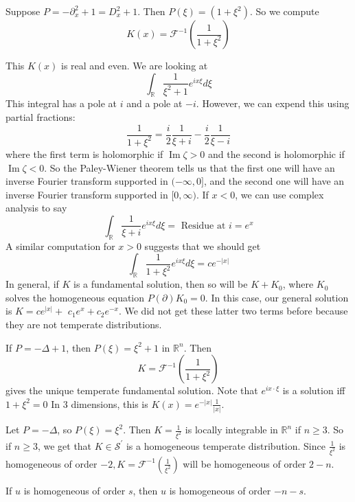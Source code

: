 \begin{example}
    Suppose $P=-\partial_{x}^{2}+1=D_{x}^{2}+1$. Then $P(\xi)=\left(1+\xi^{2}\right)$. So we compute
    $$
    K(x)=\mathcal{F}^{-1}\left(\frac{1}{1+\xi^{2}}\right)
    $$

    This $K(x)$ is real and even. We are looking at
$$
\int_{\mathbb{R}} \frac{1}{\xi^{2}+1} e^{i x \xi} d \xi
$$
This integral has a pole at $i$ and a pole at $-i$. However, we can expend this using partial fractions:
$$
\frac{1}{1+\xi^{2}}=\frac{i}{2} \frac{1}{\xi+i}-\frac{i}{2} \frac{1}{\xi-i}
$$
where the first term is holomorphic if $\operatorname{Im} \zeta>0$ and the second is holomorphic if $\operatorname{Im} \zeta<0 .$ So the Paley-Wiener theorem tells us that the first one will have an inverse Fourier transform supported in $(-\infty, 0]$, and the second one will have an inverse Fourier transform supported in $[0, \infty)$.
If $x<0$, we can use complex analysis to say
$$
\int_{\mathbb{R}} \frac{1}{\xi+i} e^{i x \xi} d \xi=\text { Residue at } i=e^{x}
$$
A similar computation for $x>0$ suggests that we should get
$$
\int_{\mathbb{R}} \frac{1}{1+\xi^{2}} e^{i x \xi} d \xi=c e^{-|x|}
$$
In general, if $K$ is a fundamental solution, then so will be $K+K_{0}$, where $K_{0}$ solves the homogeneous equation $P(\partial) K_{0}=0 .$ In this case, our general solution is $K=c e^{|x|}+$ $c_{1} e^{x}+c_{2} e^{-x}$. We did not get these latter two terms before because they are not temperate distributions.
\end{example}

\begin{example}
    If $P=-\Delta+1$, then $P(\xi)=\xi^{2}+1$ in $\mathbb{R}^{n} .$ Then
$$
K=\mathcal{F}^{-1}\left(\frac{1}{1+\xi^{2}}\right)
$$
gives the unique temperate fundamental solution. Note that $e^{i x \cdot \xi}$ is a solution iff $1+\xi^{2}=0$ In 3 dimensions, this is $K(x)=e^{-|x|} \frac{1}{|x|}$.
\end{example}

\begin{example}
    Let $P=-\Delta$, so $P(\xi)=\xi^{2} .$ Then $K=\frac{1}{\xi^{2}}$ is locally integrable in $\mathbb{R}^{n}$ if $n \geq 3$. So if $n \geq 3$, we get that $K \in \mathcal{S}^{\prime}$ is a homogeneous temperate distribution. Since $\frac{1}{\xi^{2}}$ is homogeneous of order $-2, K=\mathcal{F}^{-1}\left(\frac{1}{\xi^{2}}\right)$ will be homogeneous of order $2-n$.
\end{example}

\begin{proposition}
If $u$ is homogeneous of order $s$, then $\hat u$ is homogeneous of order $-n-s$.
\end{proposition}

